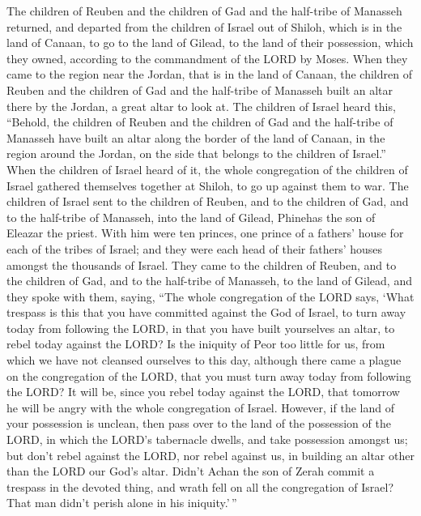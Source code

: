  The children of Reuben and the children of Gad and the
half-tribe of Manasseh returned, and departed from the children of
Israel out of Shiloh, which is in the land of Canaan, to go to the land
of Gilead, to the land of their possession, which they owned, according
to the commandment of the LORD by Moses.  When they came to
the region near the Jordan, that is in the land of Canaan, the children
of Reuben and the children of Gad and the half-tribe of Manasseh built
an altar there by the Jordan, a great altar to look at. 
The children of Israel heard this, ``Behold, the children of Reuben and
the children of Gad and the half-tribe of Manasseh have built an altar
along the border of the land of Canaan, in the region around the Jordan,
on the side that belongs to the children of Israel.''  When
the children of Israel heard of it, the whole congregation of the
children of Israel gathered themselves together at Shiloh, to go up
against them to war.  The children of Israel sent to the
children of Reuben, and to the children of Gad, and to the half-tribe of
Manasseh, into the land of Gilead, Phinehas the son of Eleazar the
priest.  With him were ten princes, one prince of a
fathers' house for each of the tribes of Israel; and they were each head
of their fathers' houses amongst the thousands of Israel. 
They came to the children of Reuben, and to the children of Gad, and to
the half-tribe of Manasseh, to the land of Gilead, and they spoke with
them, saying,  ``The whole congregation of the LORD says,
`What trespass is this that you have committed against the God of
Israel, to turn away today from following the LORD, in that you have
built yourselves an altar, to rebel today against the LORD?
 Is the iniquity of Peor too little for us, from which we
have not cleansed ourselves to this day, although there came a plague on
the congregation of the LORD,  that you must turn away
today from following the LORD? It will be, since you rebel today against
the LORD, that tomorrow he will be angry with the whole congregation of
Israel.  However, if the land of your possession is
unclean, then pass over to the land of the possession of the LORD, in
which the LORD's tabernacle dwells, and take possession amongst us; but
don't rebel against the LORD, nor rebel against us, in building an altar
other than the LORD our God's altar.  Didn't Achan the son
of Zerah commit a trespass in the devoted thing, and wrath fell on all
the congregation of Israel? That man didn't perish alone in his
iniquity.'\,''

